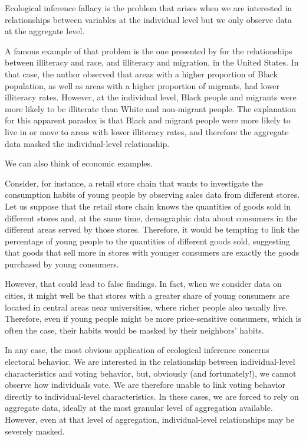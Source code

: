 
Ecological inference fallacy is the problem that arises when we are interested in relationships between variables at the individual level but we only observe data at the aggregate level.

A famous example of that problem is the one presented by \citet{Robinson1950} for the relationships between illiteracy and race, and illiteracy and migration, in the United States. In that case, the author observed that areas with a higher proportion of Black population, as well as areas with a higher proportion of migrants, had lower illiteracy rates. However, at the individual level, Black people and migrants were more likely to be illiterate than White and non-migrant people. The explanation for this apparent paradox is that Black and migrant people were more likely to live in or move to areas with lower illiteracy rates, and therefore the aggregate data masked the individual-level relationship.

We can also think of economic examples.

Consider, for instance, a retail store chain that wants to investigate the consumption habits of young people by observing sales data from different stores.
Let us suppose that the retail store chain knows the quantities of goods sold in different stores and, at the same time, demographic data about consumers in the different areas served by those stores.
Therefore, it would be tempting to link the percentage of young people to the quantities of different goods sold, suggesting that goods that sell more in stores with younger consumers are exactly the goods purchased by young consumers.

However, that could lead to false findings. In fact, when we consider data on cities, it might well be that stores with a greater share of young consumers are located in central areas near universities, where richer people also usually live. Therefore, even if young people might be more price-sensitive consumers, which is often the case, their habits would be masked by their neighbors' habits.

In any case, the most obvious application of ecological inference concerns electoral behavior. We are interested in the relationship between individual-level characteristics and voting behavior, but, obviously (and fortunately!), we cannot observe how individuals vote. We are therefore unable to link voting behavior directly to individual-level characteristics.
In these cases, we are forced to rely on aggregate data, ideally at the most granular level of aggregation available.
However, even at that level of aggregation, individual-level relationships may be severely masked.


